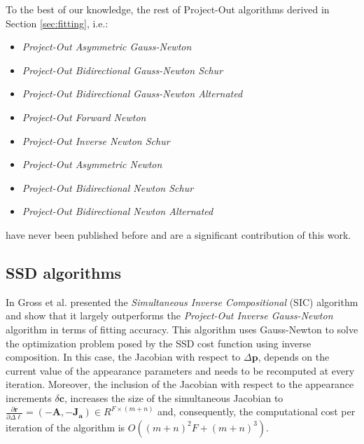 To the best of our knowledge, the rest of Project-Out algorithms derived in Section \ref{sec:fitting}, i.e.:
\begin{itemize}
\item \emph{Project-Out Asymmetric Gauss-Newton}
\item \emph{Project-Out Bidirectional Gauss-Newton Schur}
\item \emph{Project-Out Bidirectional Gauss-Newton Alternated}
\item \emph{Project-Out Forward Newton}
\item \emph{Project-Out Inverse Newton Schur}
\item \emph{Project-Out Asymmetric Newton}
\item \emph{Project-Out Bidirectional Newton Schur}
\item \emph{Project-Out Bidirectional Newton Alternated}
\end{itemize}
have never been published before and are a significant contribution of this work.

\subsection{SSD algorithms}

In \cite{Gross2005} Gross et al. presented the \emph{Simultaneous Inverse Compositional} (SIC) algorithm and show that it largely outperforms the \emph{Project-Out Inverse Gauss-Newton} algorithm in terms of fitting accuracy. This algorithm uses Gauss-Newton to solve the optimization problem posed by the SSD cost function using inverse composition. In this case, the Jacobian with respect to $\Delta\mathbf{p}$, depends on the current value of the appearance parameters and needs to be recomputed at every iteration. Moreover, the inclusion of the Jacobian with respect to the appearance increments $\delta\mathbf{c}$, increases the size of the simultaneous Jacobian to $\frac{\partial\mathbf{r}}{\partial\Delta\boldsymbol{\ell}} = \left( -\mathbf{A}, -\mathbf{J}_\mathbf{a} \right) \in R^{F \times (m + n)}$ and, consequently, the computational cost per iteration of the algorithm is $O((m + n)^2F + (m + n)^3)$.

